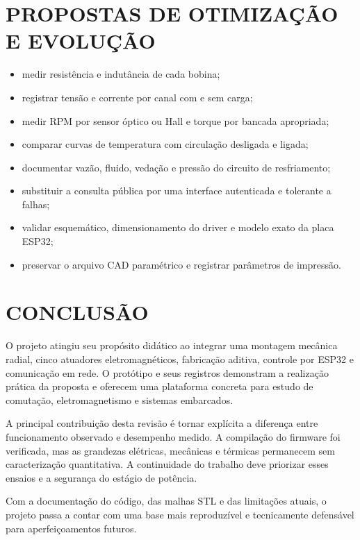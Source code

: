 \documentclass[12pt,a4paper,oneside]{article}
\begin{document}
\section{PROPOSTAS DE OTIMIZAÇÃO E EVOLUÇÃO}

\begin{itemize}
  \item medir resistência e indutância de cada bobina;
  \item registrar tensão e corrente por canal com e sem carga;
  \item medir RPM por sensor óptico ou Hall e torque por bancada apropriada;
  \item comparar curvas de temperatura com circulação desligada e ligada;
  \item documentar vazão, fluido, vedação e pressão do circuito de resfriamento;
  \item substituir a consulta pública por uma interface autenticada e tolerante a falhas;
  \item validar esquemático, dimensionamento do driver e modelo exato da placa ESP32;
  \item preservar o arquivo CAD paramétrico e registrar parâmetros de impressão.
\end{itemize}

\section{CONCLUSÃO}

O projeto atingiu seu propósito didático ao integrar uma montagem mecânica radial, cinco atuadores eletromagnéticos, fabricação aditiva, controle por ESP32 e comunicação em rede. O protótipo e seus registros demonstram a realização prática da proposta e oferecem uma plataforma concreta para estudo de comutação, eletromagnetismo e sistemas embarcados.

A principal contribuição desta revisão é tornar explícita a diferença entre funcionamento observado e desempenho medido. A compilação do firmware foi verificada, mas as grandezas elétricas, mecânicas e térmicas permanecem sem caracterização quantitativa. A continuidade do trabalho deve priorizar esses ensaios e a segurança do estágio de potência.

Com a documentação do código, das malhas STL e das limitações atuais, o projeto passa a contar com uma base mais reproduzível e tecnicamente defensável para aperfeiçoamentos futuros.
\end{document}
